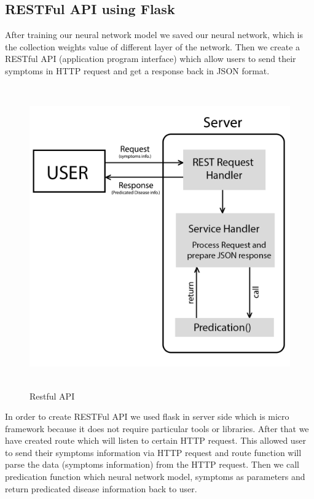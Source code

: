 {\subsection{RESTFul API using Flask}

After training our neural network model we saved our neural network, which is the collection weights value of different layer of the network. Then we create a RESTful API (application program interface) which allow users to send their symptoms in HTTP request and get a response back in JSON format.

\begin{figure}[H]
\begin{center}
\includegraphics[width=130mm, height = 130mm]{images/restapi.png}
\caption{Restful API}
\end{center}
\end{figure}

In order to create RESTFul API we used flask in server side which is micro framework because it does not require particular tools or libraries. After that we have created route which will listen to certain HTTP request. This allowed user to send their symptoms information via HTTP request and route function will parse the data (symptoms information) from the HTTP request. Then we call predication function which neural network model, symptoms as parameters and return predicated disease information back to user.

}
